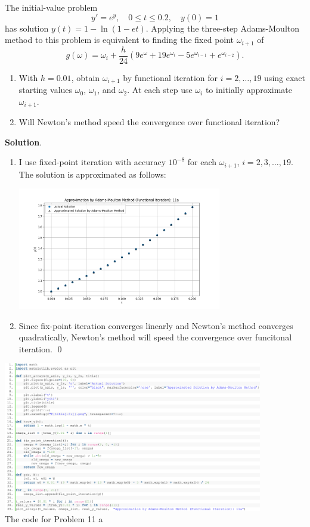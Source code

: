 \documentclass[11pt]{article}
\theoremstyle{break}
\numberwithin{equation}{theorem}
\begin{document}
\newpage
\begin{problem}\label{problem 11} %
    The initial-value problem $$y'=e^y, \quad 0\leq t\leq 0.2, \quad y(0)=1$$ has solution $y(t)=1-\ln(1-et)$. Applying the three-step Adams-Moulton method to this problem is equivalent to finding the fixed point $\omega_{i+1}$ of $$g(\omega)=\omega_i+\dfrac{h}{24}\left(9e^\omega+19e^{\omega_i}-5e^{\omega_{i-1}}+e^{\omega_{i-2}}\right).$$
    \begin{enumerate}
        \item With $h = 0.01$, obtain $\omega_{i+1}$ by functional iteration for $i = 2, \dots , 19$ using exact starting values $\omega_0$, $\omega_1$, and $\omega_2$. At each step use $\omega_i$ to initially approximate $\omega_{i+1}$.
        \item Will Newton's method speed the convergence over functional iteration?
    \end{enumerate}
\end{problem}
\textbf{Solution}. 
\begin{enumerate}
    \item I use fixed-point iteration with accuracy $10^{-8}$ for each $\omega_{i+1}$, $i=2,3,\dots, 19$. The solution is approximated as follows:
    \begin{center}
        \includegraphics[width=0.7\textwidth]{P11a.png}
    \end{center}
    \item Since fix-point iteration converges linearly and Newton's method converges quadratically, Newton's method will speed the convergence over funcitonal iteration. \qed
\end{enumerate}

\begin{center}
    \includegraphics[width=0.85\textwidth]{P11.png}\\
    The code for Problem 11 a
\end{center}
\end{document}
